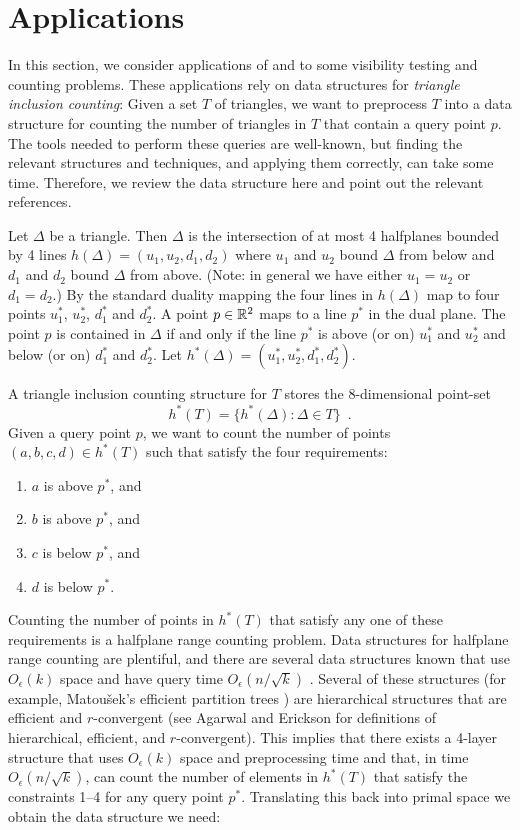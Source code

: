 \documentclass{patmorin}
\newcommand{\Oe}{O_\epsilon}
\begin{document}
\section{Applications}

In this section, we consider applications of  and
 to some visibility testing and counting problems. These
applications rely on data structures for \emph{triangle inclusion
counting}:  Given a set $T$ of triangles, we want to preprocess $T$
into a data structure for counting the number of triangles in $T$ that
contain a query point $p$.  The tools needed to perform these queries
are well-known, but finding the relevant structures and techniques,
and applying them correctly, can take some time.  Therefore, we review
the data structure here and point out the relevant references.

Let $\Delta$ be a triangle. Then $\Delta$ is the intersection of at most
4 halfplanes bounded by 4 lines $h(\Delta)=(u_1,u_2,d_1,d_2)$ where $u_1$
and $u_2$ bound $\Delta$ from below and $d_1$ and $d_2$ bound $\Delta$
from above.  (Note: in general we have either $u_1=u_2$ or $d_1=d_2$.)
By the standard duality mapping \cite[Section~8.2]{bcko08} the four lines
in $h(\Delta)$ map to four points $u_1^*$, $u_2^*$, $d_1^*$ and $d_2^*$.
A point $p\in\mathbb{R}^2$ maps to a line $p^*$ in the dual plane.  The point
$p$ is contained in $\Delta$ if and only if the line $p^*$ is above
(or on) $u_1^*$ and $u_2^*$ and below (or on) $d_1^*$ and $d_2^*$.
Let $h^*(\Delta)=(u_1^*,u_2^*,d_1^*,d_2^*)$.

A triangle inclusion counting structure for $T$ stores the 8-dimensional
point-set
\[
    h^*(T) = \{ h^*(\Delta) : \Delta\in T \} \enspace .
\]
Given a query point $p$, we want to count the number of points
$(a,b,c,d)\in h^*(T)$ such that satisfy the four requirements:
\begin{enumerate}
  \item $a$ is above $p^*$, and
  \item $b$ is above $p^*$, and 
  \item $c$ is below $p^*$, and
  \item $d$ is below $p^*$.
\end{enumerate}
Counting the number of points in $h^*(T)$ that satisfy any one of these
requirements is a halfplane range counting problem.  Data structures
for halfplane range counting are plentiful, and there are several
data structures known that use $\Oe(k)$ space and have query time
$\Oe(n/\sqrt{k})$ \cite[Section~4]{ae99}.  Several of these structures
(for example, Matou\v{s}ek's efficient partition trees \cite{m92}) are
hierarchical structures that are efficient and $r$-convergent (see Agarwal
and Erickson \cite[Section~5]{ae99} for definitions of hierarchical,
efficient, and $r$-convergent).  This implies \cite[Theorem~10]{ae99}
that there exists a 4-layer structure that uses $\Oe(k)$ space and
preprocessing time and that, in time $\Oe(n/\sqrt{k})$, can count the
number of elements in $h^*(T)$ that satisfy the constraints 1--4 for any
query point $p^*$.  Translating this back into primal space we obtain
the data structure we need:
\end{document}
